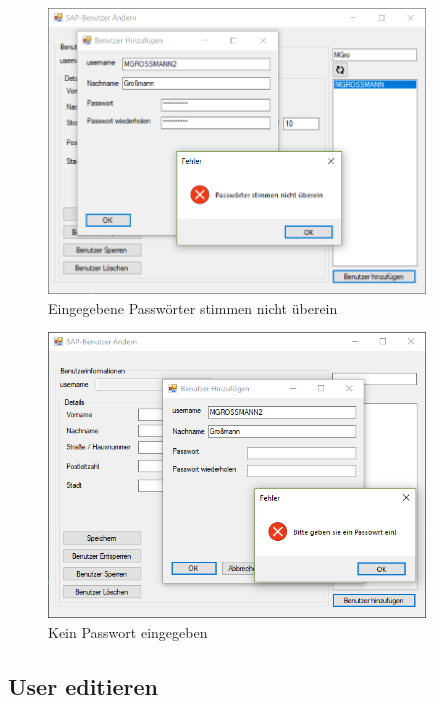 \begin{figure}[h]
	\begin{center}
		\includegraphics[width=10cm]{images/User_Hinzufuegen_Password.png}
	\end{center}
	\caption{Eingegebene Passwörter stimmen nicht überein}
	\label{fig:user_add_password}
\end{figure}

\begin{figure}[h]
	\begin{center}
		\includegraphics[width=10cm]{images/No_Password.png}
	\end{center}
	\caption{Kein Passwort eingegeben}
	\label{fig:user_no_password}
\end{figure}

\subsection{User editieren}

